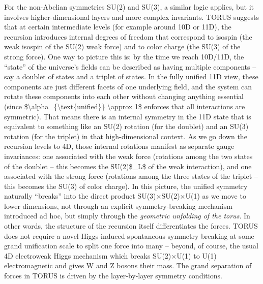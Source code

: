 \documentclass[
]{article}
\begin{document}
For the non-Abelian symmetries SU(2) and SU(3), a similar logic applies,
but it involves higher-dimensional layers and more complex invariants.
TORUS suggests that at certain intermediate levels (for example around
10D or 11D), the recursion introduces internal degrees of freedom that
correspond to isospin (the weak isospin of the SU(2) weak force) and to
color charge (the SU(3) of the strong force). One way to picture this
is: by the time we reach 10D/11D, the ``state'' of the universe's fields
can be described as having multiple components -- say a doublet of
states and a triplet of states. In the fully unified 11D view, these
components are just different facets of one underlying field, and the
system can rotate these components into each other without changing
anything essential (since
\$\textbackslash alpha\_\{\textbackslash text\{unified\}\}
\textbackslash approx 1\$ enforces that all interactions are symmetric).
That means there is an internal symmetry in the 11D state that is
equivalent to something like an SU(2) rotation (for the doublet) and an
SU(3) rotation (for the triplet) in that high-dimensional context. As we
go down the recursion levels to 4D, those internal rotations manifest as
separate gauge invariances: one associated with the weak force
(rotations among the two states of the doublet -- this becomes the
SU(2)\$\_L\$ of the weak interaction), and one associated with the
strong force (rotations among the three states of the triplet -- this
becomes the SU(3) of color charge). In this picture, the unified
symmetry naturally ``breaks'' into the direct product SU(3)×SU(2)×U(1)
as we move to lower dimensions, not through an explicit
symmetry-breaking mechanism introduced ad hoc, but simply through the
\emph{geometric unfolding of the torus}. In other words, the structure
of the recursion itself differentiates the forces. TORUS does not
require a novel Higgs-induced spontaneous symmetry breaking at some
grand unification scale to split one force into many -- beyond, of
course, the usual 4D electroweak Higgs mechanism which breaks SU(2)×U(1)
to U(1) electromagnetic and gives W and Z bosons their mass. The grand
separation of forces in TORUS is driven by the layer-by-layer symmetry
conditions.
\end{document}
